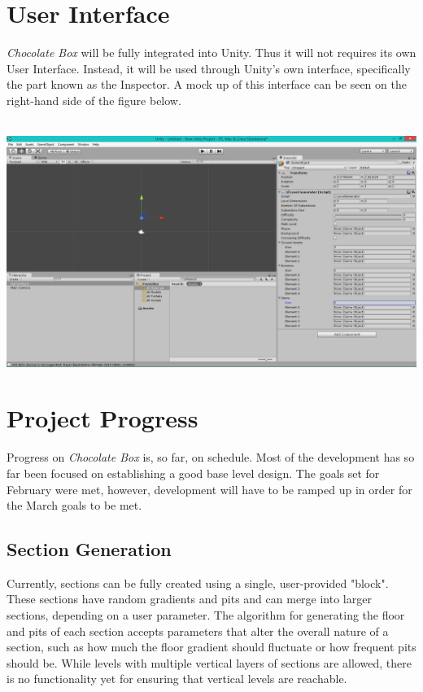 \documentclass[pdftex,12pt,letter]{article}
\begin{document}
\begin{itemize}
\begin{itemize}
\begin{itemize}
\begin{itemize}
\section{User Interface}
\textit{Chocolate Box} will be fully integrated into Unity. Thus it will not requires its own User Interface. Instead, it will be used through Unity's own interface, specifically the part known as the Inspector. A mock up of this interface can be seen on the right-hand side of the figure below.\\\\
\centerline{\includegraphics[width=7in]{UnitySS.png}}
\FloatBarrier
\section{Project Progress}
Progress on \textit{Chocolate Box} is, so far, on schedule. Most of the development has so far been focused on establishing a good base level design. The goals set for February were met, however, development will have to be ramped up in order for the March goals to be met.
\subsection{Section Generation}
Currently, sections can be fully created using a single, user-provided "block". These sections have random gradients and pits and can merge into larger sections, depending on a user parameter. The algorithm for generating the floor and pits of each section accepts parameters that alter the overall nature of a section, such as how much the floor gradient should fluctuate or how frequent pits should be. While levels with multiple vertical layers of sections are allowed, there is no functionality yet for ensuring that vertical levels are reachable. 

\end{itemize}
\end{itemize}
\end{itemize}
\end{itemize}
\end{document}

